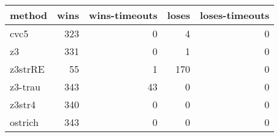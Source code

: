 \begin{tabular}{lrrrr}
\hline
 method   &   wins &   wins-timeouts &   loses &   loses-timeouts \\
\hline
 cvc5     &    323 &               0 &       4 &                0 \\
 z3       &    331 &               0 &       1 &                0 \\
 z3strRE  &     55 &               1 &     170 &                0 \\
 z3-trau  &    343 &              43 &       0 &                0 \\
 z3str4   &    340 &               0 &       0 &                0 \\
 ostrich  &    343 &               0 &       0 &                0 \\
\hline
\end{tabular}
